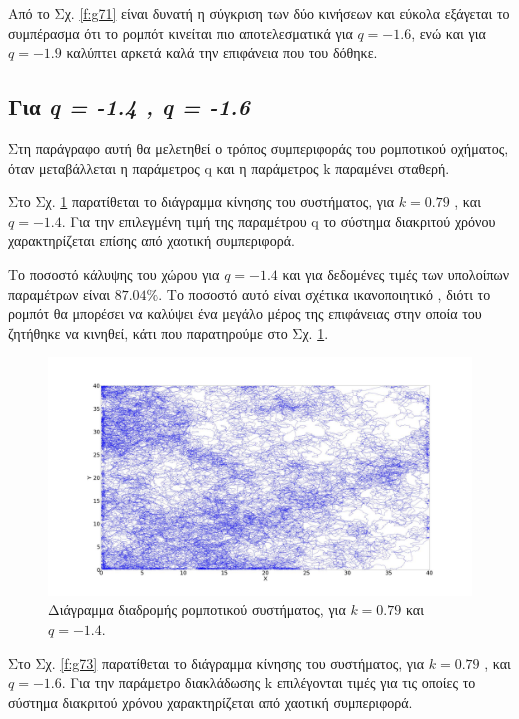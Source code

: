 Από το Σχ. \ref{f:g71} είναι δυνατή η σύγκριση των δύο κινήσεων και εύκολα εξάγεται το συμπέρασμα ότι το ρομπότ κινείται πιο αποτελεσματικά για $q = -1.6$, ενώ και για $q = -1.9$ καλύπτει αρκετά καλά την επιφάνεια που του δόθηκε.


\clearpage

\subsection{Για \emph{q = -1.4 , q = -1.6}}
\label{par:g1}
Στη παράγραφο αυτή θα μελετηθεί ο τρόπος συμπεριφοράς του ρομποτικού οχήματος, όταν μεταβάλλεται η παράμετρος q και η παράμετρος k παραμένει σταθερή.

Στο Σχ. \ref{f:g72} παρατίθεται το διάγραμμα κίνησης του συστήματος, για $k=0.79$ , και $q = -1.4$. Για την επιλεγμένη τιμή της παραμέτρου q το σύστημα διακριτού χρόνου χαρακτηρίζεται επίσης από χαοτική συμπεριφορά.

Το ποσοστό κάλυψης του χώρου για $q = -1.4$ και για δεδομένες τιμές των υπολοίπων παραμέτρων είναι $87.04 \%$. Το ποσοστό αυτό είναι σχέτικα ικανοποιητικό , διότι το ρομπότ θα μπορέσει να καλύψει ένα μεγάλο μέρος της επιφάνειας στην οποία του ζητήθηκε να κινηθεί, κάτι που παρατηρούμε στο Σχ. \ref{f:g72}.


\begin{figure}[ht]
	\centering
	\includegraphics[width=1\linewidth]{LateX images/log/q/g3-1.4}
	\caption{Διάγραμμα διαδρομής ρομποτικού συστήματος, για $k = 0.79$ και $q = -1.4$.}
	\label{f:g72}	
\end{figure}

Στο Σχ. \ref{f:g73} παρατίθεται το διάγραμμα κίνησης του συστήματος, για $k=0.79$ , και $q = -1.6$. Για την παράμετρο διακλάδωσης k επιλέγονται τιμές για τις οποίες το σύστημα διακριτού χρόνου χαρακτηρίζεται από χαοτική συμπεριφορά.

